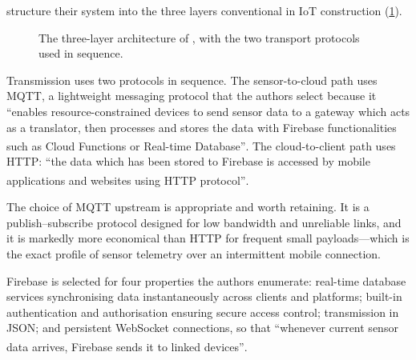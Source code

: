 \documentclass[12pt,a4paper,oneside]{report}
\newcommand{\bq}[1]{``#1''\textsuperscript{\dag}}
\begin{document}
\Textcite{efendi2025} structure their system into the three layers conventional in IoT construction (\cref{fig:iot-layers}).

\begin{figure}[htbp]
\centering
{}
\caption{The three-layer architecture of \textcite{efendi2025}, with the two transport protocols used in sequence.}\label{fig:iot-layers}
\end{figure}

Transmission uses two protocols in sequence. The sensor-to-cloud path uses MQTT, a lightweight messaging protocol that the authors select because it \bq{enables resource-constrained devices to send sensor data to a gateway which acts as a translator, then processes and stores the data with Firebase functionalities such as Cloud Functions or Real-time Database}. The cloud-to-client path uses HTTP: \bq{the data which has been stored to Firebase is accessed by mobile applications and websites using HTTP protocol}.

The choice of MQTT upstream is appropriate and worth retaining. It is a publish--subscribe protocol designed for low bandwidth and unreliable links, and it is markedly more economical than HTTP for frequent small payloads---which is the exact profile of sensor telemetry over an intermittent mobile connection.

Firebase is selected for four properties the authors enumerate: real-time database services synchronising data instantaneously across clients and platforms; built-in authentication and authorisation ensuring secure access control; transmission in JSON; and persistent WebSocket connections, so that \bq{whenever current sensor data arrives, Firebase sends it to linked devices}.
\end{document}
